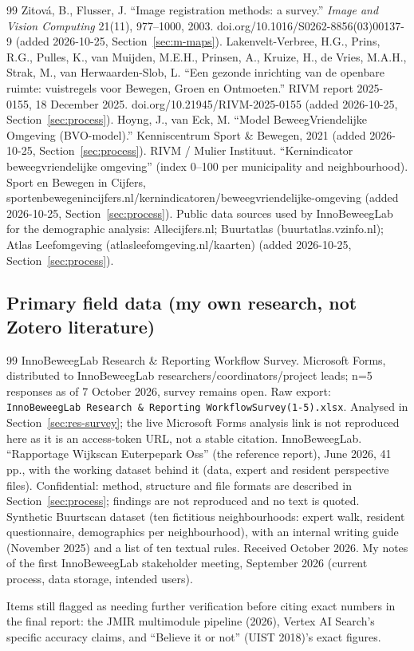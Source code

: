 \begin{thebibliography}{99}
 Zitov\'a, B., Flusser, J. \textquotedblleft{}Image registration methods: a survey.\textquotedblright{} \textit{Image and Vision Computing} 21(11), 977--1000, 2003. doi.org/10.1016/S0262-8856(03)00137-9 (added 2026-10-25, Section~\ref{sec:m-maps}).
 Lakenvelt-Verbree, H.G., Prins, R.G., Pulles, K., van Muijden, M.E.H., Prinsen, A., Kruize, H., de Vries, M.A.H., Strak, M., van Herwaarden-Slob, L. \textquotedblleft{}Een gezonde inrichting van de openbare ruimte: vuistregels voor Bewegen, Groen en Ontmoeten.\textquotedblright{} RIVM report 2025-0155, 18 December 2025. doi.org/10.21945/RIVM-2025-0155 (added 2026-10-25, Section~\ref{sec:process}).
 Hoyng, J., van Eck, M. \textquotedblleft{}Model BeweegVriendelijke Omgeving (BVO-model).\textquotedblright{} Kenniscentrum Sport \& Bewegen, 2021 (added 2026-10-25, Section~\ref{sec:process}).
 RIVM / Mulier Instituut. \textquotedblleft{}Kernindicator beweegvriendelijke omgeving\textquotedblright{} (index 0--100 per municipality and neighbourhood). Sport en Bewegen in Cijfers, sportenbewegenincijfers.nl/kernindicatoren/beweegvriendelijke-omgeving (added 2026-10-25, Section~\ref{sec:process}).
 Public data sources used by InnoBeweegLab for the demographic analysis: Allecijfers.nl; Buurtatlas (buurtatlas.vzinfo.nl); Atlas Leefomgeving (atlasleefomgeving.nl/kaarten) (added 2026-10-25, Section~\ref{sec:process}).
\end{thebibliography}

\subsection*{Primary field data (my own research, not Zotero literature)}
\begin{thebibliography}{99}
\setcounter{enumiv}{53}
 InnoBeweegLab Research \& Reporting Workflow Survey. Microsoft Forms, distributed to InnoBeweegLab researchers/coordinators/project leads; n=5 responses as of 7 October 2026, survey remains open. Raw export: \texttt{InnoBeweegLab Research \& Reporting WorkflowSurvey(1-5).xlsx}. Analysed in Section~\ref{sec:res-survey}; the live Microsoft Forms analysis link is not reproduced here as it is an access-token URL, not a stable citation.
 InnoBeweegLab. \textquotedblleft{}Rapportage Wijkscan Euterpepark Oss\textquotedblright{} (the reference report), June 2026, 41 pp., with the working dataset behind it (data, expert and resident perspective files). Confidential: method, structure and file formats are described in Section~\ref{sec:process}; findings are not reproduced and no text is quoted.
 Synthetic Buurtscan dataset (ten fictitious neighbourhoods: expert walk, resident questionnaire, demographics per neighbourhood), with an internal writing guide (November 2025) and a list of ten textual rules. Received October 2026.
 My notes of the first InnoBeweegLab stakeholder meeting, September 2026 (current process, data storage, intended users).
\end{thebibliography}

Items still flagged as needing further verification before citing exact numbers in the final report: the JMIR multimodule pipeline (2026), Vertex AI Search's specific accuracy claims, and \textquotedblleft{}Believe it or not\textquotedblright{} (UIST 2018)'s exact figures.

